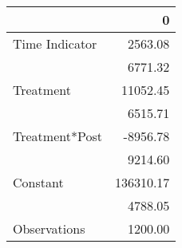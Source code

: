 \begin{tabular}{lr}
\toprule
{} &          0 \\
\midrule
Time Indicator &    2563.08 \\
               &    6771.32 \\
Treatment      &   11052.45 \\
               &    6515.71 \\
Treatment*Post &   -8956.78 \\
               &    9214.60 \\
Constant       &  136310.17 \\
               &    4788.05 \\
Observations   &    1200.00 \\
\bottomrule
\end{tabular}
